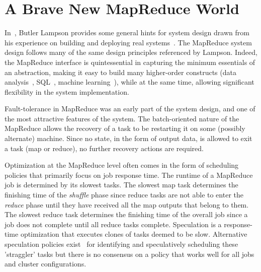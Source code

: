 

\section{A Brave New MapReduce World}

In~\cite{lampson-hints}, Butler Lampson provides some general hints for system design drawn from his experience 
on building and deploying real systems~\cite{alto, dorado, bravo, star}. The MapReduce system design follows many of the 
same design principles referenced by Lampson.  Indeed, the MapReduce interface is quintessential in capturing the minimum essentials of an 
abstraction, making it easy to build many higher-order constructs (data analysis~\cite{pig}, SQL~\cite{hive}, machine learning~\cite{mahout}), while
at the same time, allowing significant flexibility in the system implementation. 

Fault-tolerance in MapReduce was an early part of the system design, and one of the most attractive
features of the system. The batch-oriented nature of the MapReduce allows the recovery of a task to 
be restarting it on some (possibly alternate) machine. Since no state, in the
form of output data, is allowed to exit a task (map or reduce), no further recovery actions are required.

Optimization at the MapReduce level often comes in the form of scheduling policies that primarily focus on job response time. 
The runtime of a MapReduce job is determined by its slowest tasks. The slowest map task determines the finishing 
time of the {\em shuffle} phase since reduce tasks are not able to enter the {\em reduce} phase until they have received 
all the map outputs that belong to them. The slowest reduce task determines the finishing time of the overall job since a 
job does not complete until all reduce tasks complete. Speculation is a response-time optimization that executes clones
of tasks deemed to be slow. Alternative speculation policies exist~\cite{mapreduce-osdi, late-sched} 
for identifying and speculatively scheduling these 'straggler' tasks but there is no consensus on a policy 
that works well for all jobs and cluster configurations.  

